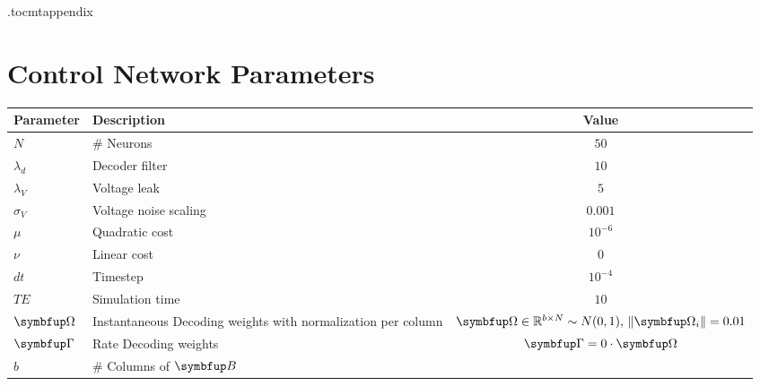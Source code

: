 \newpage
\appendix
\newpage
\etocdepthtag.toc{mtappendix}
\tableofcontents
\newpage


\chapter{Control Network Parameters}
\begin{center}
\begin{tabular}{|>{\bfseries}l|p{8cm}|c|}
	\hline
	Parameter & Description & Value \\
	\hline
	$N$ & \# Neurons & $50$ \\
	\hline
	$\lambda_d$ & Decoder filter & $10$ \\
\hline
$\lambda_V$ & Voltage leak & $5$ \\
\hline
$\sigma_V$ & Voltage noise scaling & $0.001$ \\
\hline
$\mu$ & Quadratic cost & $10^{-6}$ \\
\hline
$\nu$ & Linear cost & $0$ \\
\hline
$dt$ & Timestep & $10^{-4}$ \\
\hline
$TE$ & Simulation time & $10$ \\
\hline
$\bmu{\Omega}$ & Instantaneous Decoding weights with normalization per column& $\bmu{\Omega}\in \mathbb{R}^{b\times N} \sim N(0,1) ,\, \|\bmu{\Omega}_i\| = 0.01$\\
\hline
$\bmu{\Gamma}$ & Rate Decoding weights & $\bmu{\Gamma} = 0\cdot \bmu{\Omega}$\\
\hline
$b$ & \# Columns of $\bmu{B}$ & \\
\hline
\end{tabular}
\end{center}



